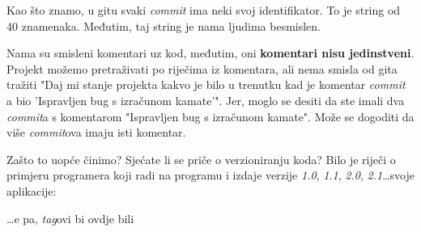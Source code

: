 Kao što znamo, u gitu svaki \emph{commit} ima neki svoj identifikator. 
To je string od 40 znamenaka.
Međutim, taj string je nama ljudima besmislen.

Nama su smisleni komentari uz kod, međutim, oni \textbf{komentari nisu jedinstveni}.
Projekt možemo pretraživati po riječima iz komentara, ali nema smisla od gita tražiti "Daj mi stanje projekta kakvo je bilo u trenutku kad je komentar \emph{commit} a bio 'Ispravljen bug s izračunom kamate'".
Jer, moglo se desiti da ste imali dva \emph{commit}a s komentarom "Ispravljen bug s izračunom kamate".
Može se dogoditi da više \emph{commit}ova imaju isti komentar.

Zašto to uopće činimo?
Sjećate li se priče o verzioniranju koda?
Bilo je riječi o primjeru programera koji radi na programu i izdaje verzije \emph{1.0}, \emph{1.1}, \emph{2.0}, \emph{2.1}\dots svoje aplikacije:



\dots{}e pa, \emph{tag}ovi bi ovdje bili 
